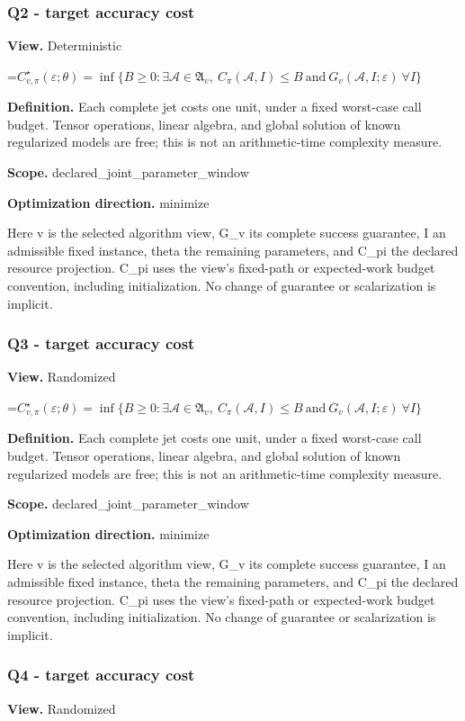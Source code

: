\documentclass[10pt,a4paper]{article}
\newcommand{\AtlasMath}[1]{\par\begingroup\centering\setbox0=\hbox{$\displaystyle #1$}\ifdim\wd0>1.4\linewidth\typeout{ATLAS WIDE FORMULA: \the\wd0}\fi\ifdim\wd0>\linewidth\resizebox{\linewidth}{!}{\box0}\else\box0\fi\par\endgroup}
\begin{document}
\subsubsection{Q2 - target accuracy cost}
\textbf{View.} Deterministic

\AtlasMath{C^\star_{v,\pi}(\varepsilon;\theta)=\inf\{B\ge0:\exists\mathcal A\in\mathfrak A_v,\ C_\pi(\mathcal A,I)\le B\ \text{and}\ G_v(\mathcal A,I;\varepsilon)\ \forall I\}}
\textbf{Definition.} Each complete jet costs one unit, under a fixed worst-case call budget. Tensor operations, linear algebra, and global solution of known regularized models are free; this is not an arithmetic-time complexity measure.

\textbf{Scope.} declared\_joint\_parameter\_window

\textbf{Optimization direction.} minimize

Here v is the selected algorithm view, G\_v its complete success guarantee, I an admissible fixed instance, theta the remaining parameters, and C\_pi the declared resource projection. C\_pi uses the view's fixed-path or expected-work budget convention, including initialization. No change of guarantee or scalarization is implicit.

\subsubsection{Q3 - target accuracy cost}
\textbf{View.} Randomized

\AtlasMath{C^\star_{v,\pi}(\varepsilon;\theta)=\inf\{B\ge0:\exists\mathcal A\in\mathfrak A_v,\ C_\pi(\mathcal A,I)\le B\ \text{and}\ G_v(\mathcal A,I;\varepsilon)\ \forall I\}}
\textbf{Definition.} Each complete jet costs one unit, under a fixed worst-case call budget. Tensor operations, linear algebra, and global solution of known regularized models are free; this is not an arithmetic-time complexity measure.

\textbf{Scope.} declared\_joint\_parameter\_window

\textbf{Optimization direction.} minimize

Here v is the selected algorithm view, G\_v its complete success guarantee, I an admissible fixed instance, theta the remaining parameters, and C\_pi the declared resource projection. C\_pi uses the view's fixed-path or expected-work budget convention, including initialization. No change of guarantee or scalarization is implicit.

\subsubsection{Q4 - target accuracy cost}
\textbf{View.} Randomized
\end{document}
